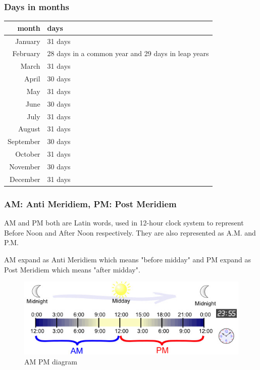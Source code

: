 \documentclass[10pt]{article}
\begin{document}
\subsubsection{Days in months}
\hspace{1cm}
\begin{tabular}{r l}
	month & days \\ [0.5ex] 
	\hline\hline
	\rowcolor{Gray}
	January & 31 days \\ 
	February & 28 days in a common year and 29 days in leap years \\
	\rowcolor{Gray}
	March & 31 days \\
	April & 30 days \\
	\rowcolor{Gray}
	May & 31 days \\ 
	June & 30 days \\
	\rowcolor{Gray}
	July & 31 days \\
	August & 31 days \\
	\rowcolor{Gray}
	September & 30 days \\
	October & 31 days \\
	\rowcolor{Gray}
	November & 30 days \\
	December & 31 days \\
	\hline
\end{tabular}

\hspace{1cm}
\subsubsection{AM: Anti Meridiem, PM: Post Meridiem}

AM and PM both are Latin words, used in 12-hour clock system to represent Before Noon and After Noon respectively. They are also represented as A.M. and P.M. \\ \hspace{1cm}

AM expand as Anti Meridiem which means "before midday" and PM expand as Post Meridiem which means "after midday". \hspace{1cm}

\begin{figure}[h]
	\centering
	\includegraphics[width=1\linewidth]{day-am-pm}
	\caption{AM PM diagram}
	\label{fig:day-am-pm}
\end{figure}
\end{document}
